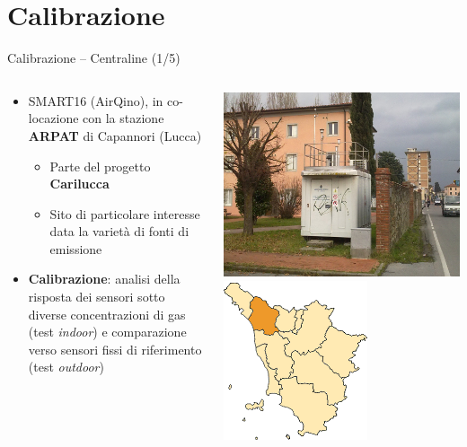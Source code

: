 \section{Calibrazione}

\begin{frame}{Calibrazione – Centraline (1/5)}
\begin{columns}
\begin{column}{0.58\textwidth}
\begin{itemize}
  \item \alert{SMART16} (AirQino), in co-locazione con la stazione \textbf{ARPAT} di Capannori (Lucca)\vspace{.1cm}
  \begin{itemize}
    \item Parte del progetto \textbf{Carilucca}\vspace{.1cm}
    \item Sito di particolare interesse data la varietà di fonti di emissione\,\footnotemark
  \end{itemize}\vspace{.05cm}
  \item \textbf{Calibrazione}: analisi della risposta dei sensori sotto diverse concentrazioni di gas (test \textit{indoor}) e comparazione verso sensori fissi di riferimento (test \textit{outdoor})
\end{itemize}
\end{column}
\begin{column}{0.46\textwidth}
\vspace{-.2cm}
\begin{center}
\includegraphics[width=.45\textwidth]{images/lu-capannori}
\hspace{.2cm}
\includegraphics[width=.33\textwidth]{images/cartina-provincia-lucca}

\end{center}
\end{column}
\end{columns}
\end{frame}
